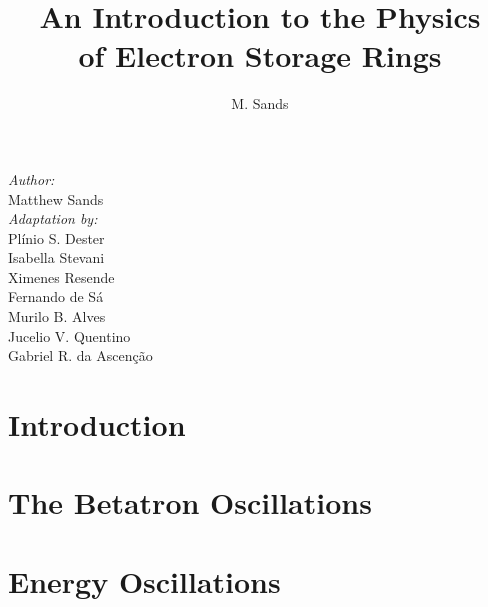 \documentclass[ebook,a4paper,12pt,oneside,openany]{memoir}
\title{An Introduction to the Physics\\ of Electron Storage Rings}
\author{M. Sands}
\numberwithin{equation}{chapter}
\begin{document}
\maketitle
\vspace{30mm}
\begin{flushright}
    \textit{Author:} \\
    \vspace{1mm}
        Matthew Sands \\
    \vspace{5mm}
    \textit{Adaptation by:} \\
    \vspace{1mm}
	Pl\'inio S. Dester \\
	Isabella Stevani \\
	Ximenes Resende \\
  Fernando de S\'a \\
  Murilo B. Alves \\
    Jucelio V. Quentino \\
    Gabriel R. da Ascenção \\
\end{flushright}

\thispagestyle{empty}

\newpage
\tableofcontents

\newpage


\chapter{Introduction} \label{ch:1}
    
    
    

\chapter{The Betatron Oscillations} \label{ch:2}
    
    
    
    
    
    
    
    
    
    
    
    

\chapter{Energy Oscillations} \label{ch:3}
    
    
    
    
    
\end{document}
